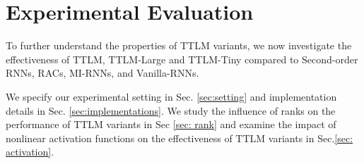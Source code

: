 \documentclass{article}
\theoremstyle{plain}
\theoremstyle{definition}
\theoremstyle{remark}
\begin{document}
\section{Experimental Evaluation} 
\label{sec: experiments}

To further understand the properties of TTLM variants, we now investigate the effectiveness of TTLM, TTLM-Large and TTLM-Tiny compared to Second-order RNNs, RACs, MI-RNNs, and Vanilla-RNNs. 


We specify our  experimental setting in Sec. \ref{sec:setting} and implementation details in Sec. \ref{sec:implementations}. We study the influence of ranks on the performance of TTLM variants in Sec \ref{sec: rank} and examine the impact of nonlinear activation functions on the effectiveness of TTLM variants in Sec.\ref{sec: activation}. 
\end{document}
